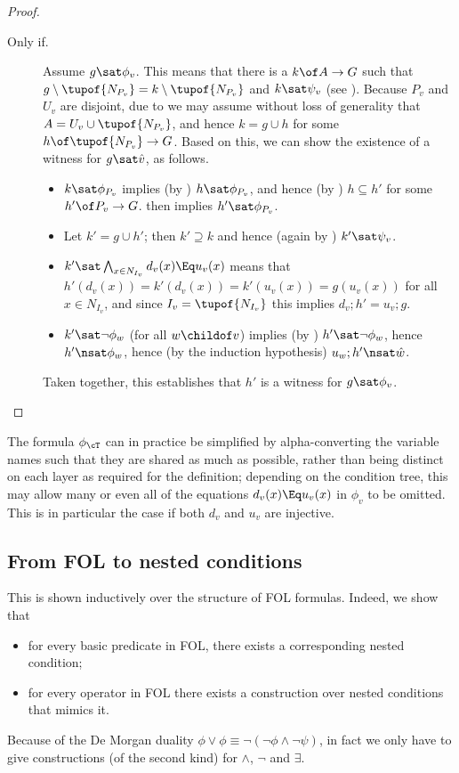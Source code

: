 \begin{proof}
\begin{description}
\smallskip
\item[Only if.] Assume $g\sat \phi_v$. This means that there is a $k\of A\to G$ such that $g\setminus \tupof{N_{P_v}}=k\setminus \tupof{N_{P_v}}$ and $k\sat \psi_v$ (see ). Because $P_v$ and $U_v$ are disjoint, due to  we may assume without loss of generality that $A= U_v\cup\tupof{N_{P_v}}$, and hence $k=g\cup h$ for some $h\of \tupof{N_{P_v}}\to G$. Based on this, we can show the existence of a witness for $g\sat \hat v$, as follows.
\begin{itemize}
\item $k\sat \phi_{P_v}$ implies (by ) $h\sat \phi_{P_v}$, and hence (by ) $h\subseteq h'$ for some $h'\of P_v\to G$.  then implies $h'\sat \phi_{P_v}$.

\item Let $k'=g\cup h'$; then $k'\supseteq k$ and hence (again by ) $k'\sat \psi_v$.

\item $k'\sat \bigwedge_{x\in N_{I_v}} d_v(x)\Eq u_v(x)$ means that $h'(d_v(x))=k'(d_v(x))=k'(u_v(x))=g(u_v(x))$ for all $x\in N_{I_v}$, and since $I_v=\tupof{N_{I_v}}$ this implies $d_v;h'=u_v;g$.

\item $k'\sat \neg\phi_w$ (for all $w\childof v$) implies (by ) $h'\sat\neg\phi_w$, hence $h'\nsat\phi_w$, hence (by the induction hypothesis) $u_w;h'\nsat \hat w$.
\end{itemize}

Taken together, this establishes that $h'$ is a witness for  $g\sat \phi_v$.
\end{description}
\end{proof}
%
The formula $\phi_\cT$ can in practice be simplified by alpha-converting the variable names such that they are shared as much as possible, rather than being distinct on each layer as required for the definition; depending on the condition tree, this may allow many or even all of the equations $d_v(x)\Eq u_v(x)$ in $\phi_v$ to be omitted. This is in particular the case if both $d_v$ and $u_v$ are injective.

\subsection{From FOL to nested conditions}

This is shown inductively over the structure of FOL formulas. Indeed, we show that
\begin{itemize}
\item for every basic predicate in FOL, there exists a corresponding nested condition;
\item for every operator in FOL there exists a construction over nested conditions that mimics it.
\end{itemize}
%
Because of the De Morgan duality $\phi\vee \phi\equiv \neg(\neg\phi\wedge \neg\psi)$, in fact we only have to give constructions (of the second kind) for $\wedge$, $\neg$ and $\exists$.

